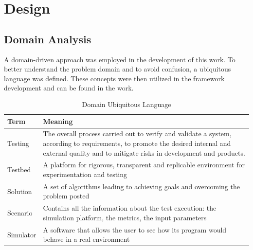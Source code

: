 \documentclass[12pt,a4paper,openright,twoside]{book}
\begin{document}
\chapter{Design}

\section{Domain Analysis}

A domain-driven approach was employed in the development of this work.
To better understand the problem domain and to avoid confusion, a ubiquitous language was defined.
These concepts were then utilized in the framework development and can be found in the work.

\begin{table}[H]
  \centering
  \begin{tabular}{|l|p{}|}
    \toprule
    \textbf{Term} & \textbf{Meaning}                                                                                                                                                                                    \\
    \midrule
    Testing       & The overall process carried out to verify and validate a system, according to requirements, to promote the desired internal and external quality and to mitigate risks in development and products. \\ \hline
    Testbed       & A platform for rigorous, transparent and replicable environment for experimentation and testing                                                                                                     \\ \hline
    Solution      & A set of algorithms leading to achieving goals and overcoming the problem posted                                                                                                                    \\ \hline
    Scenario      & Contains all the information about the test execution: the simulation platform, the metrics, the input parameters                                                                                   \\ \hline
    Simulator     & A software that allows the user to see how its program would behave in a real environment                                                                                                           \\ \hline
  \end{tabular}
  \caption{Domain Ubiquitous Language}
\end{table}
\end{document}
